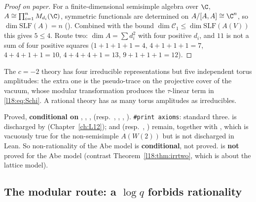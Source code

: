 \begin{proof}[Proof on paper]
For a finite-dimensional semisimple algebra over $\C$, $A\cong\prod_{i=1}^nM_{d_i}(\C)$, symmetric functionals are
determined on $A/[A,A]\cong\C^n$, so $\dim\mathrm{SLF}(A)=n$ ().
Combined with the bound $\dim\mathcal C_1\le\dim\mathrm{SLF}(A(V))$ this gives $5\le4$. Route two: $\dim A=\sum d_i^2$ with
four positive $d_i$, and $11$ is not a sum of four positive squares ($1+1+1+1=4$, $4+1+1+1=7$, $4+4+1+1=10$,
$4+4+4+1=13$, $9+1+1+1=12$).
\end{proof}
\begin{physics}
The $c=-2$ theory has four irreducible representations but five independent torus amplitudes: the extra one is
the pseudo-trace on the projective cover of the vacuum, whose modular transformation produces the
$\tau$-linear term in \eqref{l18:eq:Schi}. A rational theory has as many torus amplitudes as irreducibles.
\end{physics}
\begin{status}
Proved, \textbf{conditional on} , , ,  (resp.\ ,
, , ). \texttt{\#print axioms}: standard three.  is discharged by
 (Chapter~\ref{ch:L12});  and  (resp.\ , )
remain, together with , which is vacuously true for the non-semisimple $A(W(2))$ but is not discharged in
Lean. So non-rationality of the Abe model is \textbf{conditional}, not proved. 
is \textbf{not} proved for the Abe model (contrast Theorem~\ref{l18:thm:irrtwo}, which is about the lattice model).
\end{status}

\subsection{The modular route: a \texorpdfstring{$\log q$}{log q} forbids rationality}\label{l18:sec:logmodular}

